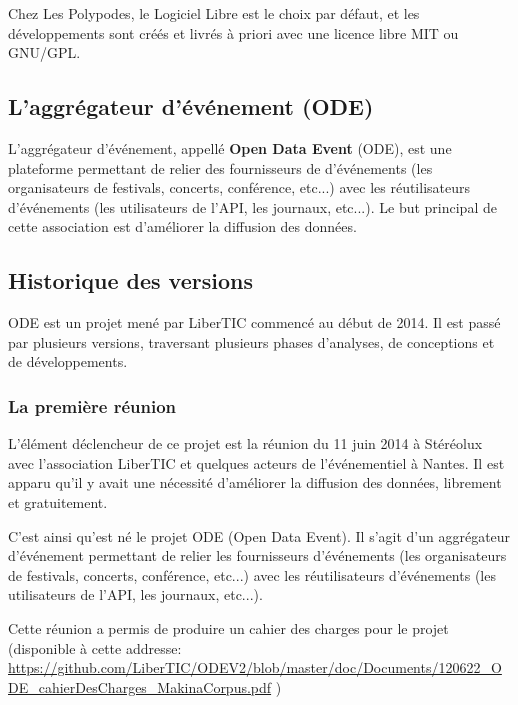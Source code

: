 Chez Les Polypodes, le Logiciel Libre est le choix par défaut, et les développements sont créés et livrés à priori avec une licence libre MIT ou GNU/GPL.

\subsection{L'aggrégateur d'événement (ODE)}

L'aggrégateur d'événement, appellé \textbf{Open Data Event} (ODE), est une plateforme permettant de relier des fournisseurs de d'événements  (les organisateurs de festivals, concerts, conférence, etc...) avec les réutilisateurs d’événements (les utilisateurs de l’API, les journaux, etc...). Le but principal de cette association est d'améliorer la diffusion des données.


\subsection{Historique des versions}

ODE est un projet mené par LiberTIC commencé au début de 2014. Il est passé par plusieurs versions, traversant plusieurs phases d'analyses, de conceptions et de développements.

\subsubsection*{La première réunion}

L'élément déclencheur de ce projet est la réunion du 11 juin 2014 à Stéréolux avec l'association LiberTIC et quelques acteurs de l'événementiel à Nantes. Il est apparu qu'il y avait une nécessité d'améliorer la diffusion des données, librement et gratuitement.

C'est ainsi qu'est né le projet ODE (Open Data Event). Il s'agit d'un aggrégateur d'événement permettant de relier les fournisseurs d'événements (les organisateurs de festivals, concerts, conférence, etc...) avec les réutilisateurs d'événements (les utilisateurs de l'API, les journaux, etc...).

Cette réunion a permis de produire un cahier des charges pour le projet (disponible à cette addresse: \url{https://github.com/LiberTIC/ODEV2/blob/master/doc/Documents/120622_ODE_cahierDesCharges_MakinaCorpus.pdf} )

